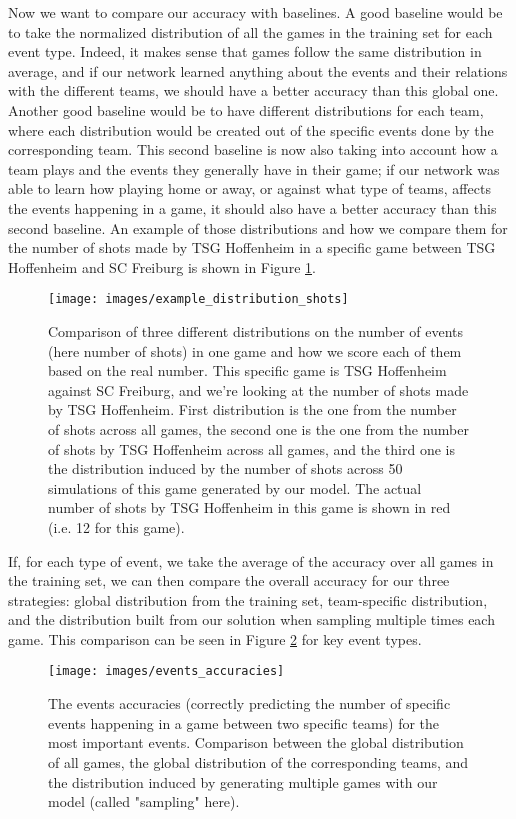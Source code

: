 \documentclass[10pt,conference,onecolumn]{IEEEtran}
\begin{document}
Now we want to compare our accuracy with baselines. A good baseline would be to take the normalized distribution of all the games in the training set for each event type. Indeed, it makes sense that games follow the same distribution in average, and if our network learned anything about the events and their relations with the different teams, we should have a better accuracy than this global one. Another good baseline would be to have different distributions for each team, where each distribution would be created out of the specific events done by the corresponding team. This second baseline is now also taking into account how a team plays and the events they generally have in their game; if our network was able to learn how playing home or away, or against what type of teams, affects the events happening in a game, it should also have a better accuracy than this second baseline. An example of those distributions and how we compare them for the number of shots made by TSG Hoffenheim in a specific game between TSG Hoffenheim and SC Freiburg is shown in Figure \ref{fig:example_distribution_shots}.

\begin{figure}[H]
\centering
\texttt{[image: images/example\_distribution\_shots]}
\caption{Comparison of three different distributions on the number of events (here number of shots) in one game and how we score each of them based on the real number. This specific game is TSG Hoffenheim against SC Freiburg, and we're looking at the number of shots made by TSG Hoffenheim. First distribution is the one from the number of shots across all games, the second one is the one from the number of shots by TSG Hoffenheim across all games, and the third one is the distribution induced by the number of shots across 50 simulations of this game generated by our model. The actual number of shots by TSG Hoffenheim in this game is shown in red (i.e. 12 for this game).}
\label{fig:example_distribution_shots}
\end{figure}

If, for each type of event, we take the average of the accuracy over all games in the training set, we can then compare the overall accuracy for our three strategies: global distribution from the training set, team-specific distribution, and the distribution built from our solution when sampling multiple times each game. This comparison can be seen in Figure \ref{fig:events_accuracies} for key event types.

\begin{figure}[H]
\centering
\texttt{[image: images/events\_accuracies]}
\caption{The events accuracies (correctly predicting the number of specific events happening in a game between two specific teams) for the most important events. Comparison between the global distribution of all games, the global distribution of the corresponding teams, and the distribution induced by generating multiple games with our model (called "sampling" here).}
\label{fig:events_accuracies}
\end{figure}
\end{document}
